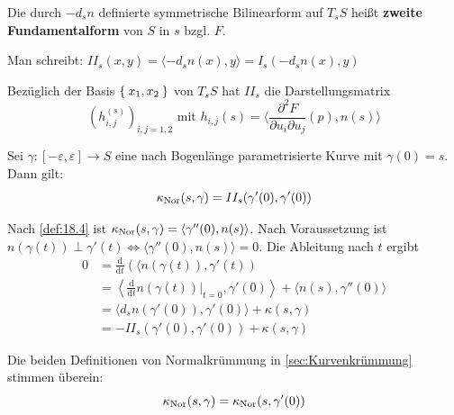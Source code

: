 \begin{definition}%
    Die durch $-d_s n$ definierte symmetrische Bilinearform auf $T_s S$ heißt
    \textbf{zweite Fundamentalform} von $S$ in $s$ bzgl. $F$.

    Man schreibt: $II_s(x,y) =  \langle - d_s n(x), y \rangle = I_s (-d_s n(x), y)$
\end{definition}

\begin{bemerkung}%
    Bezüglich der Basis $\Set{x_1, x_2}$ von $T_s S$ hat $II_s$ die Darstellungsmatrix
    \[(h^{(s)}_{i,j})_{i,j=1,2} \text{ mit } h_{i,j}(s) = \langle \frac{\partial^2 F}{\partial u_i \partial u_j} (p), n(s) \rangle \]
\end{bemerkung}

\begin{proposition}\label{prop:19.6}%
    Sei $\gamma:[- \varepsilon, \varepsilon] \rightarrow S$ eine nach Bogenlänge
    parametrisierte Kurve mit $\gamma(0) = s$. Dann gilt:
    \[\kappa_{\textnormal{Nor}}(s, \gamma) = II_s(\gamma'(0), \gamma'(0))\]
\end{proposition}

\begin{beweis}
    Nach \cref{def:18.4} ist $\kappa_{\textnormal{Nor}}(s, \gamma) = \langle \gamma''(0), n(s) \rangle$.
    Nach Voraussetzung ist $n(\gamma(t)) \perp \gamma'(t) \Leftrightarrow \langle \gamma''(0), n(s) \rangle = 0$.
    Die Ableitung nach $t$ ergibt 
    \begin{align*}
        0 &= \frac{\mathrm{d}}{\mathrm{d}t}(\langle n (\gamma(t)), \gamma'(t))\\
        &= \left \langle \frac{\mathrm{d}}{\mathrm{d}t} n(\gamma(t)) \Bigr |_{t=0}, \gamma'(0) \right \rangle + \langle n(s), \gamma''(0) \rangle\\
        &= \langle d_s n (\gamma'(0)), \gamma'(0) \rangle + \kappa(s,\gamma)\\
        &= - II_s(\gamma'(0), \gamma'(0)) + \kappa(s, \gamma)
    \end{align*}
\end{beweis}

\begin{folgerung}%
    Die beiden Definitionen von Normalkrümmung in \cref{sec:Kurvenkrümmung} stimmen
    überein:
    \[\kappa_{\textnormal{Nor}}(s, \gamma) = \kappa_{\textnormal{Nor}}(s, \gamma'(0))\]
\end{folgerung}

